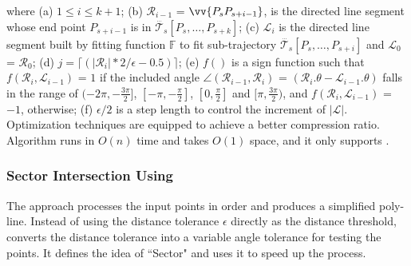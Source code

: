 \ni where (a) $1 \le i \le k+1$; (b) $\mathcal{R}_{i-1}$ = $\vv{P_sP_{s+i-1}}$, is the directed line segment whose end point $P_{s+i-1}$ is in $\dddot{\mathcal{T}_s}[P_s, \ldots, P_{s+k}]$; (c) $\mathcal{L}_{i}$ is the directed line segment built by fitting function $\mathbb{F}$ to fit sub-trajectory $\dddot{\mathcal{T}_s}[P_s, \ldots, P_{s+i}]$ and $\mathcal{L}_{0}$ = $\mathcal{R}_{0}$; (d) $j = \lceil(|\mathcal{R}_{i}|*2/\epsilon - 0.5)\rceil$; (e) $f()$ is a sign function such that $ f(\mathcal{R}_i,\mathcal{L}_{i-1})$ = $1$ if the included angle $\angle(\mathcal{R}_{i-1}, \mathcal{R}_{i})$ = $(\mathcal{R}_i.\theta - \mathcal{L}_{i-1}.\theta)$ falls in the range of $(-2\pi, -\frac{3\pi}{2}]$, $[-\pi, -\frac{\pi}{2}]$, $[0, \frac{\pi}{2}]$ and $[\pi, \frac{3\pi}{2})$, and $f(\mathcal{R}_i,\mathcal{L}_{i-1})$ = $-1$, otherwise; (f) $\epsilon/2$ is a step length to control the increment of $|\mathcal{L}|$.
%
Optimization techniques are equipped to achieve a better compression ratio\cite{Lin:Operb}.
Algorithm \operb runs in $O(n)$ time and takes $O(1)$ space, and it only supports \ped.





\vspace{-0.5ex}
\subsubsection {Sector Intersection Using \ped}
\label{sec-siped}

The \siped approach processes the input points in order and produces a simplified poly-line. Instead of using the distance tolerance $\epsilon$ directly as the distance threshold, \siped converts the distance tolerance into a variable angle tolerance for testing the points. It defines the idea of ``Sector" \cite{Williams:Longest, Sklansky:Cone, Dunham:Cone, Zhao:Sleeve}  and uses it to speed up the process.



